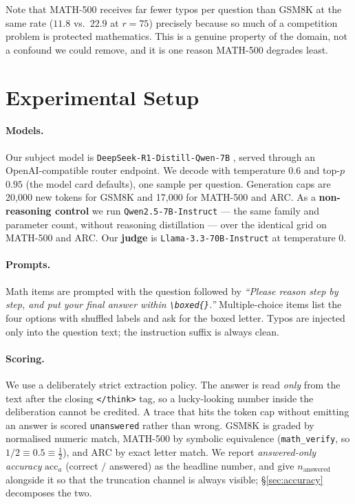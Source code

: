 \documentclass[11pt]{article}
\begin{document}
Note that MATH-500 receives far fewer typos per question than GSM8K at the same
rate ($11.8$ vs.\ $22.9$ at $r{=}75$) precisely because so much of a competition
problem is protected mathematics. This is a genuine property of the domain, not
a confound we could remove, and it is one reason MATH-500 degrades least.
\section{Experimental Setup}
\label{sec:setup}

\paragraph{Models.}
Our subject model is \texttt{DeepSeek-R1-Distill-Qwen-7B}
\citep{deepseekr1}, served through an OpenAI-compatible router endpoint. We
decode with temperature $0.6$ and top-$p$ $0.95$ (the model card defaults), one
sample per question. Generation caps are 20{,}000 new tokens for GSM8K and
17{,}000 for MATH-500 and ARC. As a \textbf{non-reasoning control} we run
\texttt{Qwen2.5-7B-Instruct} \citep{qwen25} --- the same family and parameter
count, without reasoning distillation --- over the identical grid on MATH-500
and ARC. Our \textbf{judge} is \texttt{Llama-3.3-70B-Instruct}
\citep{llama3} at temperature $0$.

\paragraph{Prompts.}
Math items are prompted with the question followed by \emph{``Please reason step
by step, and put your final answer within \texttt{\textbackslash boxed\{\}}.''}
Multiple-choice items list the four options with shuffled labels and ask for the
boxed letter. Typos are injected only into the question text; the instruction
suffix is always clean.

\paragraph{Scoring.}
We use a deliberately strict extraction policy. The answer is read
\emph{only} from the text after the closing \texttt{</think>} tag, so a
lucky-looking number inside the deliberation cannot be credited. A trace that
hits the token cap without emitting an answer is scored \texttt{unanswered}
rather than wrong. GSM8K is graded by normalised numeric match, MATH-500 by
symbolic equivalence (\texttt{math\_verify}, so $1/2 \equiv 0.5 \equiv
\frac{1}{2}$), and ARC by exact letter match. We report
\emph{answered-only accuracy} $\mathrm{acc}_a$ (correct $/$ answered) as the
headline number, and give $n_{\text{answered}}$ alongside it so that the
truncation channel is always visible; \S\ref{sec:accuracy} decomposes the two.
\end{document}
